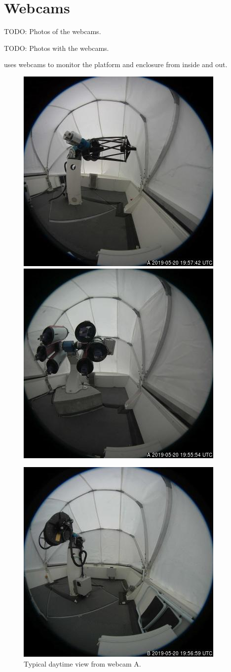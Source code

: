 \chapter{Webcams}
\label{chapter:webcams}

TODO: Photos of the webcams.

TODO: Photos with the webcams.

{\projectname} uses webcams to monitor the platform and enclosure from inside and out.

\begin{figure}[t]
\begin{center}
\ifcoatlioan
\includegraphics[height=0.6\linewidth]{figures/coatli-webcam-a.jpg}
\fi
\ifddotioan
\includegraphics[height=0.6\linewidth]{figures/ddoti-webcam-a.jpg}
\fi
\end{center}
\caption{Typical daytime view from {\projectname} webcam A.}
\label{figure:webcam-a-view}
\begin{center}
\ifcoatlioan
\includegraphics[height=0.6\linewidth]{figures/coatli-webcam-b.jpg}

\end{center}
\end{figure}
